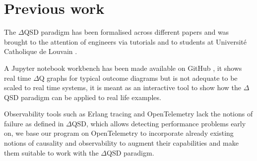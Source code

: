 \section{Previous work}
    The $\Delta$QSD paradigm has been formalised across different papers \cite{myo} \cite{art} and was brought to the attention of engineers via tutorials \cite{dq-tut} and to students at Université Catholique de Louvain \cite{dq-ucl}. 
    
    A Jupyter notebook workbench has been made available on GitHub \cite{dqsd-wkb}, it shows real time $\Delta$Q graphs for typical outcome diagrams but is not adequate to be scaled to real time systems, it is meant as an interactive tool to show how the $\Delta$QSD paradigm can be applied to real life examples.
    
    Observability tools such as Erlang tracing \cite{erl-t} and OpenTelemetry \cite{otel-e} lack the notions of failure as defined in $\Delta$QSD, which allows detecting performance problems early on, we base our program on OpenTelemetry to incorporate already existing notions of causality and observability to augment their capabilities and make them suitable to work with the $\Delta$QSD paradigm.
